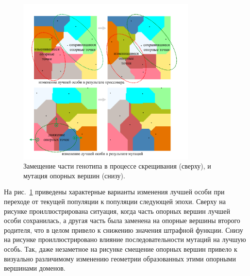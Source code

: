 \begin{figure}[ht]
\centering
\includegraphics[width=0.8\textwidth]{./pics/text_2_genetic/changes.pdf}
\singlespacing
{}\caption{Замещение части генотипа\label{term:genotype2} в процессе скрещивания (сверху), и мутация опорных вершин\label{term:opor_point2} (снизу).}
\label{fig:text_2_genetic_changes}
\end{figure}

На рис.~\ref{fig:text_2_genetic_changes} приведены характерные варианты изменения лучшей особи при переходе от текущей популяции к популяции следующей эпохи.
Сверху на рисунке проиллюстрирована ситуация, когда часть опорных вершин лучшей особи сохранилась, а другая часть была заменена на опорные вершины второго родителя, что в целом привело к снижению значения штрафной функции.
Снизу на рисунке проиллюстрировано влияние последовательности мутаций на лучшую особь.
Так, даже незаметное на рисунке смещение опорных вершин привело к визуально различимому изменению геометрии образованных этими опорными вершинами доменов.

